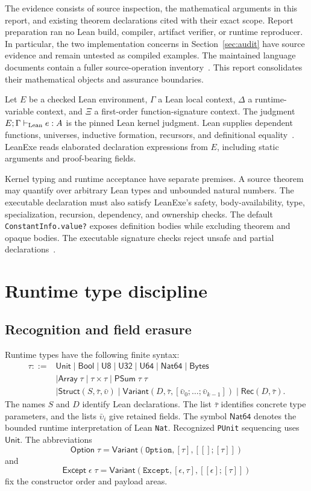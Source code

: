 \documentclass[11pt]{article}
\newcommand{\code}[1]{\texttt{#1}}
\newcommand{\ty}[1]{\mathsf{#1}}
\begin{document}
The evidence consists of source inspection, the mathematical arguments in this report, and existing theorem declarations cited with their exact scope.  Report preparation ran no Lean build, compiler, artifact verifier, or runtime reproducer.  In particular, the two implementation concerns in Section~\ref{sec:audit} have source evidence and remain untested as compiled examples.  The maintained language documents contain a fuller source-operation inventory~\cite{typetheory,specification}.  This report consolidates their mathematical objects and assurance boundaries.

Let $E$ be a checked Lean environment, $\Gamma$ a Lean local context, $\Delta$ a runtime-variable context, and $\Xi$ a first-order function-signature context.  The judgment $E;\Gamma\vdash_{\rm Lean} e:A$ is the pinned Lean kernel judgment.  Lean supplies dependent functions, universes, inductive formation, recursors, and definitional equality~\cite{lean}.  LeanExe reads elaborated declaration expressions from $E$, including static arguments and proof-bearing fields.

Kernel typing and runtime acceptance have separate premises.  A source theorem may quantify over arbitrary Lean types and unbounded natural numbers.  The executable declaration must also satisfy LeanExe's safety, body-availability, type, specialization, recursion, dependency, and ownership checks.  The default \code{ConstantInfo.value?} exposes definition bodies while excluding theorem and opaque bodies.  The executable signature checks reject unsafe and partial declarations~\cite{types,extract}.

\section{Runtime type discipline}

\subsection{Recognition and field erasure}

Runtime types have the following finite syntax:
\begin{align*}
\tau ::= {}&\ty{Unit}\mid\ty{Bool}\mid\ty{U8}\mid\ty{U32}\mid\ty{U64}
       \mid\ty{Nat64}\mid\ty{Bytes}\\
 &\mid\ty{Array}\;\tau\mid\tau\times\tau\mid\ty{PSum}\;\tau\;\tau\\
 &\mid\ty{Struct}(S,\bar\tau,\bar\upsilon)
  \mid\ty{Variant}(D,\bar\tau,[\bar\upsilon_0;\ldots;\bar\upsilon_{k-1}])
  \mid\ty{Rec}(D,\bar\tau).
\end{align*}
The names $S$ and $D$ identify Lean declarations.  The list $\bar\tau$ identifies concrete type parameters, and the lists $\bar\upsilon_i$ give retained fields.  The symbol $\ty{Nat64}$ denotes the bounded runtime interpretation of Lean \code{Nat}.  Recognized \code{PUnit} sequencing uses $\ty{Unit}$.  The abbreviations
\[
\ty{Option}\;\tau=\ty{Variant}(\code{Option},[\tau],[[];[\tau]])
\]
and
\[
\ty{Except}\;\epsilon\;\tau
=\ty{Variant}(\code{Except},[\epsilon,\tau],[[\epsilon];[\tau]])
\]
fix the constructor order and payload areas.
\end{document}
